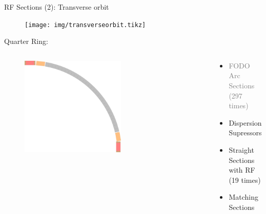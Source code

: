 \documentclass{beamer}
\begin{document}
\begin{frame}[t,fragile]{RF Sections (2): Transverse orbit}
\begin{figure}
\centering
\texttt{[image: img/transverseorbit.tikz]}
\end{figure}
\begin{center}
Quarter Ring:
\end{center}
\begin{columns}
\begin{column}{0.4\textwidth}
   \begin{figure}
   \centering
   \includegraphics[width=0.6\textwidth]{img/quarterring.pdf}
   \end{figure}
\end{column}
\begin{column}{0.6\textwidth}  %
    \begin{itemize}
    \item \textcolor{gray}{FODO Arc Sections (297 times)}
    \item \textcolor{orange!50}{Dispersion Supressors}
    \item \textcolor{red!50}{Straight Sections with RF (19 times)}
    \item \textcolor{brown!70}{Matching Sections}
    \end{itemize}
\end{column}
\end{columns}


\end{frame}
\end{document}
